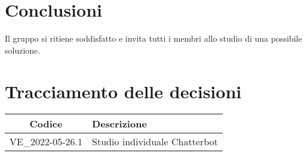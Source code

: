 \section{Conclusioni}
Il gruppo si ritiene soddisfatto e invita tutti i membri allo studio di una possibile soluzione.
\newpage

\section*{Tracciamento delle decisioni}
	\renewcommand{\arraystretch}{1.8} %
	\begin{tabular}{ |c|l| }
		\hline
		\textbf{Codice} & \textbf{Descrizione} \\
		\hline
		VE\_2022-05-26.1 & Studio individuale Chatterbot \\ %
		\hline
	\end{tabular}